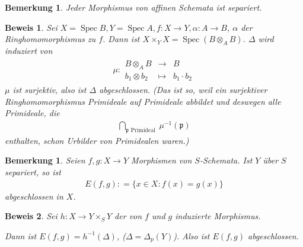 \documentclass[a4paper,oneside]{scrbook}
\theoremstyle{break}
\newtheorem{Bem}[Def]{Bemerkung}
\theoremstyle{nonumberbreak}
\theoremstyle{nonumberplain}
\newtheorem{Bew}{Beweis}
\theoremstyle{break}
\newcommand{\defeqr}[0]{\mathrel{\mathop:}=}
\newcommand{\Abb}[5]{\ensuremath{#1:\begin{array}{ccc} #2 & \longrightarrow & #3 \\ #4 & \longmapsto & #5 \end{array}}}
\newcommand{\Spec}{%
	\ensuremath{\operatorname{Spec}}%
}
\begin{document}
\begin{Bem}
  \label{bem:7.2}
  Jeder Morphismus von affinen Schemata ist separiert.
\end{Bem}

\begin{Bew}
  Sei $X=\Spec B, Y=\Spec A, f:X\to Y, \alpha:A\to B$, $\alpha$ der Ringhomomorphismus zu $f$.
  Dann ist $X\times_YX=\Spec(B\otimes_A B)$. $\Delta$ wird induziert von
  \begin{align*}
    \Abb{\mu}{B\otimes_A B}{B}{b_1\otimes b_2}{b_1\cdot b_2}
  \end{align*}
  $\mu$ ist surjektiv, also ist $\Delta$ abgeschlossen. (Das ist so, weil ein surjektiver Ringhomomorphismus
  Primideale auf Primideale abbildet und deswegen alle Primideale, die
  \begin{align*}
    \bigcap_{\mathfrak p\text{ Primideal }}\mu^{-1}(\mathfrak p)
  \end{align*}
  enthalten, schon Urbilder von Primidealen waren.)
\end{Bew}

\begin{Bem}
  \label{bem:7.3}
  Seien $f,g:X\to Y$ Morphismen von $S$-Schemata. Ist $Y$ über $S$ separiert, so ist
  \begin{align*}
    E(f,g)\defeqr\{x\in X:f(x)=g(x)\}
  \end{align*}
  abgeschlossen in $X$.
\end{Bem}

\begin{Bew}
  Sei $h:X\to Y\times_S Y$ der von $f$ und $g$ induzierte Morphismus.
  \begin{center}
  \end{center}
  Dann ist $E(f,g)=h^{-1}(\Delta)$, ($\Delta=\Delta_p(Y)$). Also ist $E(f,g)$ abgeschlossen.
\end{Bew}
\end{document}
